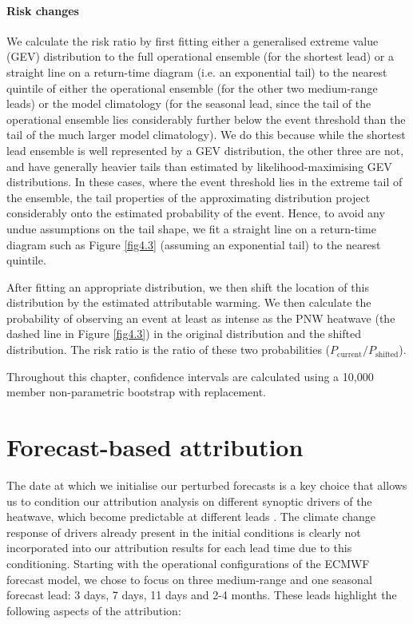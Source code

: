     \paragraph*{Risk changes}
  
      We calculate the risk ratio by first fitting either a generalised extreme value (GEV) distribution to the full operational ensemble (for the shortest lead) or a straight line on a return-time diagram (i.e. an exponential tail) to the nearest quintile of either the operational ensemble (for the other two medium-range leads) or the model climatology (for the seasonal lead, since the tail of the operational ensemble lies considerably further below the event threshold than the tail of the much larger model climatology). We do this because while the shortest lead ensemble is well represented by a GEV distribution, the other three are not, and have generally heavier tails than estimated by likelihood-maximising GEV distributions. In these cases, where the event threshold lies in the extreme tail of the ensemble, the tail properties of the approximating distribution project considerably onto the estimated probability of the event. Hence, to avoid any undue assumptions on the tail shape, we fit a straight line on a return-time diagram such as Figure \ref{fig4.3} (assuming an exponential tail) to the nearest quintile. 
  
      After fitting an appropriate distribution, we then shift the location of this distribution by the estimated attributable warming. We then calculate the probability of observing an event at least as intense as the PNW heatwave (the dashed line in Figure \ref{fig4.3}) in the original distribution and the shifted distribution. The risk ratio is the ratio of these two probabilities ($P_\text{current} / P_\text{shifted}$).
  
      Throughout this chapter, confidence intervals are calculated using a 10,000 member non-parametric bootstrap with replacement.

\section{Forecast-based attribution}\label{ch4:attribution}

  The date at which we initialise our perturbed forecasts is a key choice that allows us to condition our attribution analysis on different synoptic drivers of the heatwave, which become predictable at different leads \cite{lin_2021_2022,mo_anomalous_2022}. The climate change response of drivers already present in the initial conditions is clearly not incorporated into our attribution results for each lead time due to this conditioning. Starting with the operational configurations of the ECMWF forecast model, we chose to focus on three medium-range and one seasonal forecast lead: 3 days, 7 days, 11 days and 2-4 months. These leads highlight the following aspects of the attribution: 

